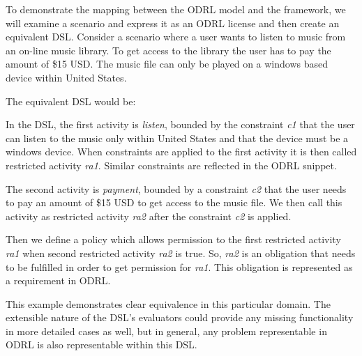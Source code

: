 To demonstrate the mapping between the ODRL model and the framework, we will examine a scenario and express it as an ODRL license and then create an equivalent DSL. Consider a scenario where a user wants to listen to music from an on-line music library. To get access to the library the user has to pay the amount of \$15 USD. The music file can only be played on a windows based device within United States.



The equivalent DSL would be:



In the DSL, the first activity is \emph{listen}, bounded by the constraint {\em c1} that the user can listen to the music only within United States and that the device must be a windows device. When constraints are applied to the first activity it is then called restricted activity {\em ra1}. Similar constraints are reflected in the ODRL snippet.

The second activity is \emph{payment}, bounded by a constraint {\em c2} that the user needs to pay an amount of \$15 USD to get access to the music file. We then call this activity as restricted activity {\em ra2} after the constraint {\em c2} is applied. 

Then we define a policy which allows permission to the first restricted activity {\em ra1} when second restricted activity {\em ra2} is true. So, {\em ra2} is an obligation that needs to be fulfilled in order to get permission for {\em ra1}. This obligation is represented as a requirement in ODRL.

This example demonstrates clear equivalence in this particular domain.  The extensible nature of the DSL's evaluators could provide any missing functionality in more detailed cases as well, but in general, any problem representable in ODRL is also representable within this DSL.
